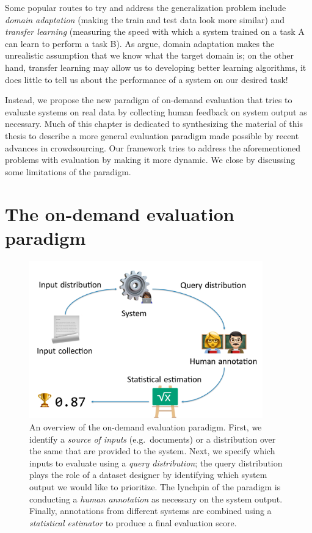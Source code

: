 Some popular routes to try and address the generalization problem include \textit{domain adaptation} (making the train and test data look more similar) and \textit{transfer learning} (measuring the speed with which a system trained on a task A can learn to perform a task B).
As \citet{plank16nonstandard} argue, domain adaptation makes the unrealistic assumption that we know what the target domain is;
  on the other hand, transfer learning may allow us to developing better learning algorithms, it does little to tell us about the performance of a system on our desired task!

Instead, we propose the new paradigm  of on-demand evaluation that tries to evaluate systems on real data by collecting human feedback on system output as necessary.
Much of this chapter is dedicated to synthesizing the material of this thesis to describe a more general evaluation paradigm made possible by recent advances in crowdsourcing.
Our framework tries to address the aforementioned problems with evaluation by making it more dynamic.
We close by discussing some limitations of the paradigm.

\section{The on-demand evaluation paradigm}

\begin{figure}
  \centering
  \includegraphics[width=0.9\textwidth]{figures/overview}
  \caption[Overview of the on-demand evaluation paradigm]{\label{fig:conclusions:overview}
  An overview of the on-demand evaluation paradigm. 
  First, we identify a \textit{source of inputs} (e.g.\ documents) or a distribution over the same that are provided to the system.
  Next, we specify which inputs to evaluate using a \textit{query distribution}; the query distribution plays the role of a dataset designer by identifying which system output we would like to prioritize.
  The lynchpin of the paradigm is conducting a \textit{human annotation} as necessary on the system output. 
  Finally, annotations from different systems are combined using a \textit{statistical estimator} to produce a final evaluation score.
  }
\end{figure}

